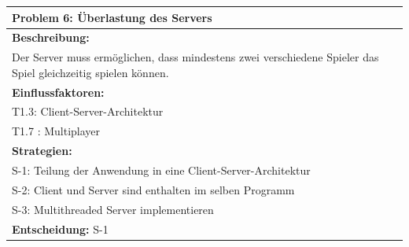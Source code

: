\documentclass[fontsize=12pt,paper=a4,twoside]{scrartcl}
\begin{document}
\begin{longtable}{|p{15cm}|}
\hline
Problem 6: Überlastung des Servers                                                                           
\\ \hline                                                                                                                                                                                                                                                                                                                                                                                                                                                                                                                                                        
\textbf{Beschreibung:} \\
Der Server muss ermöglichen, dass mindestens zwei verschiedene Spieler das Spiel gleichzeitig spielen können.
\\ \hline
\textbf{Einflussfaktoren:} \\
T1.3: Client-Server-Architektur \\
T1.7 : Multiplayer
\\ \hline
\textbf{Strategien:} \\
S-1: Teilung der Anwendung in eine Client-Server-Architektur \\
S-2: Client und Server sind enthalten im selben Programm \\
S-3: Multithreaded Server implementieren
 \\ \hline
 \textbf{Entscheidung:} S-1
\\ \hline
\end{longtable}
\newpage
\end{document}
